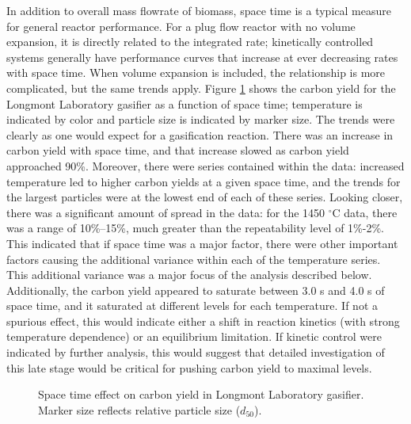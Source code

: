 \documentclass[11pt,twocolumn]{article}
\begin{document}
In addition to overall mass flowrate of biomass, space time is a typical measure for general reactor performance.  For a plug flow reactor with no volume expansion, it is directly related to the integrated rate; kinetically controlled systems generally have performance curves that increase at ever decreasing rates with space time.  When volume expansion is included, the relationship is more complicated, but the same trends apply.  Figure \ref{fig-Lab-Xg-tau} shows the carbon yield for the Longmont Laboratory gasifier as a function of space time; temperature is indicated by color and particle size is indicated by marker size.  The trends were clearly as one would expect for a gasification reaction.  There was an increase in carbon yield with space time, and that increase slowed as carbon yield approached 90\%.  Moreover, there were series contained within the data: increased temperature led to higher carbon yields at a given space time, and the trends for the largest particles were at the lowest end of each of these series.  Looking closer, there was a significant amount of spread in the data: for the 1450 $^{\circ}$C data, there was a range of 10\%--15\%, much greater than the repeatability level of 1\%-2\%.  This indicated that if space time was a major factor, there were other important factors causing the additional variance within each of the temperature series.  This additional variance was a major focus of the analysis described below.  Additionally, the carbon yield appeared to saturate between 3.0 s and 4.0 s of space time, and it saturated at different levels for each temperature.  If not a spurious effect, this would indicate either a shift in reaction kinetics (with strong temperature dependence) or an equilibrium limitation.  If kinetic control were indicated by further analysis, this would suggest that detailed investigation of this late stage would be critical for pushing carbon yield to maximal levels. 

\begin{figure}[hp]

\caption{Space time effect on carbon yield in Longmont Laboratory gasifier.  Marker size reflects relative particle size ($d_{50}$).}
\label{fig-Lab-Xg-tau}
\end{figure}
\end{document}
